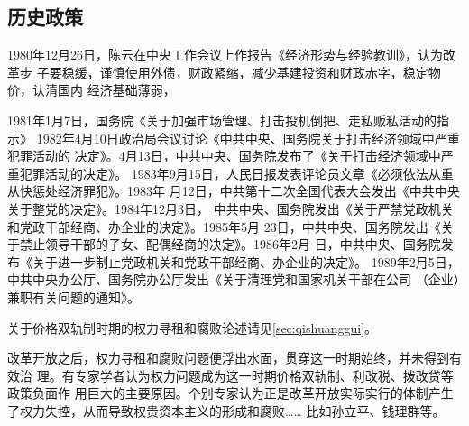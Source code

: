 \subsection{历史政策}
1980年12月26日，陈云在中央工作会议上作报告《经济形势与经验教训》，认为改革步
子要稳缓，谨慎使用外债，财政紧缩，减少基建投资和财政赤字，稳定物价，认清国内
经济基础薄弱，

1981年1月7日，国务院《关于加强市场管理、打击投机倒把、走私贩私活动的指示》
1982年4月10日政治局会议讨论《中共中央、国务院关于打击经济领域中严重犯罪活动的
决定》。4月13日，中共中央、国务院发布了《关于打击经济领域中严重犯罪活动的决定》。
1983年9月15日，人民日报发表评论员文章《必须依法从重从快惩处经济罪犯》。1983年
月12日，中共第十二次全国代表大会发出《中共中央关于整党的决定》。1984年12月3日，
中共中央、国务院发出《关于严禁党政机关和党政干部经商、办企业的决定》。1985年5月
23日，中共中央、国务院发出《关于禁止领导干部的子女、配偶经商的决定》。1986年2月
日，中共中央、国务院发布《关于进一步制止党政机关和党政干部经商、办企业的决定》。
1989年2月5日，中共中央办公厅、国务院办公厅发出《关于清理党和国家机关干部在公司
（企业）兼职有关问题的通知》。

关于价格双轨制时期的权力寻租和腐败论述请见\cref{sec:qishuanggui}。


改革开放之后，权力寻租和腐败问题便浮出水面，贯穿这一时期始终，并未得到有效治
理。有专家学者认为权力问题成为这一时期价格双轨制、利改税、拨改贷等政策负面作
用巨大的主要原因。个别专家认为正是改革开放实际实行的体制产生了权力失控，从而导致权贵资本主义的形成和腐败……%
比如孙立平\cite{sunlipingkuibai}、钱理群\cite{maohehoumao2}等。







